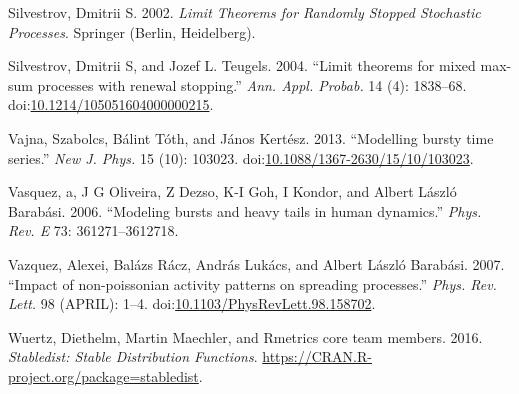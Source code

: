 \documentclass[smallextended]{svjour3}       %
\begin{document}
\hypertarget{ref-Silvestrov2002a}{}
Silvestrov, Dmitrii S. 2002. \emph{Limit Theorems for Randomly Stopped
Stochastic Processes}. Springer (Berlin, Heidelberg).

\hypertarget{ref-ST04}{}
Silvestrov, Dmitrii S, and Jozef L. Teugels. 2004. ``Limit theorems for
mixed max-sum processes with renewal stopping.'' \emph{Ann. Appl.
Probab.} 14 (4): 1838--68.
doi:\href{https://doi.org/10.1214/105051604000000215}{10.1214/105051604000000215}.

\hypertarget{ref-Vajna2013}{}
Vajna, Szabolcs, Bálint Tóth, and János Kertész. 2013. ``Modelling
bursty time series.'' \emph{New J. Phys.} 15 (10): 103023.
doi:\href{https://doi.org/10.1088/1367-2630/15/10/103023}{10.1088/1367-2630/15/10/103023}.


\hypertarget{ref-Vasquez2006}{}
Vasquez, a, J G Oliveira, Z Dezso, K-I Goh, I Kondor, and Albert László
Barabási. 2006. ``Modeling bursts and heavy tails in human dynamics.''
\emph{Phys. Rev. E} 73: 361271--3612718.

\hypertarget{ref-Vazquez2007}{}
Vazquez, Alexei, Balázs Rácz, András Lukács, and Albert László Barabási.
2007. ``Impact of non-poissonian activity patterns on spreading
processes.'' \emph{Phys. Rev. Lett.} 98 (APRIL): 1--4.
doi:\href{https://doi.org/10.1103/PhysRevLett.98.158702}{10.1103/PhysRevLett.98.158702}.

\hypertarget{ref-stabledist}{}
Wuertz, Diethelm, Martin Maechler, and Rmetrics core team members. 2016.
\emph{Stabledist: Stable Distribution Functions}.
\url{https://CRAN.R-project.org/package=stabledist}.
\end{document}
